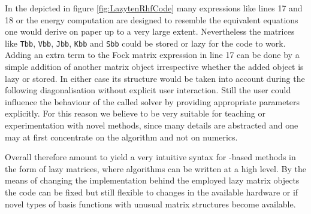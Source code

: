 In the \SCF depicted in figure \ref{fig:LazytenRhfCode}
many expressions like lines 17 and 18 or the energy computation
are designed to resemble the equivalent equations one would derive on paper
up to a very large extent.
Nevertheless the matrices like
\texttt{Tbb}, \texttt{Vbb}, \texttt{Jbb}, \texttt{Kbb} and \texttt{Sbb}
could be stored or lazy for the code to work.
Adding an extra term to the Fock matrix expression in line 17 can be done by a simple
addition of another matrix object
irrespective whether the added object is lazy or stored.
In either case its structure would be taken into account
during the following diagonalisation
without explicit user interaction.
Still the user could influence the behaviour of the called solver
by providing appropriate parameters explicitly.
For this reason we believe \lazyten to be very suitable for teaching
or experimentation with novel methods,
since many details are abstracted and one may at first concentrate
on the algorithm and not on numerics.

Overall \lazyten therefore amount to yield a very intuitive syntax
for \contraction-based methods in the form of lazy matrices,
where algorithms can be written at a high level.
By the means of changing the implementation behind the
employed lazy matrix objects the code can be fixed but still flexible
to changes in the available hardware or
if novel types of basis functions with unusual matrix structures
become available.
